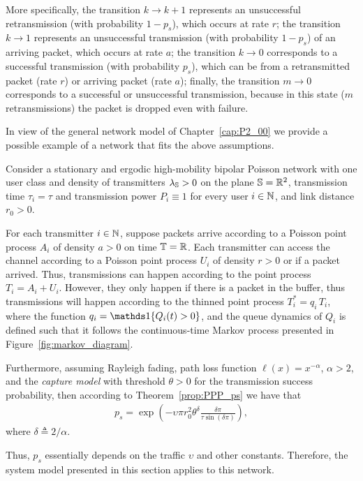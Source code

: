 More specifically,
%
the transition $k\to k+1$ represents an unsuccessful retransmission (with probability $1-p_s$), which occurs at rate $r$;
%
the transition $k\to 1$ represents an unsuccessful transmission (with probability $1-p_s$) of an arriving packet, which occurs at rate $a$;
%
the transition $k\to 0$ corresponds to a successful transmission (with probability $p_s$), which can be from a retransmitted packet (rate $r$) or arriving packet (rate $a$);
%
finally, the transition $m\to 0$ corresponds to a successful or unsuccessful transmission, because in this state ($m$ retransmissions) the packet is dropped even with failure.

In view of the general network model of Chapter~\ref{cap:P2_00} we provide a possible example of a network that fits the above assumptions.
%
\begin{example} 
    Consider a stationary and ergodic high-mobility bipolar Poisson network with one user class and density of transmitters $\lambda_{\S}>0$ on the plane $\S=\R^2$, transmission time $\tau_i = \tau$ and transmission power $P_i \equiv 1$ for every user $i\in\N$, and link distance $r_0 > 0$.
    
    For each transmitter $i\in\N$, suppose packets arrive according to a Poisson point process $A_i$ of density $a>0$ on time $\T = \R$. Each transmitter can access the channel according to a Poisson point process $U_{i}$ of density $r>0$ or if a packet arrived. Thus, transmissions can happen according to the point process $T_i = A_i + U_i$. However, they only happen if there is a packet in the buffer, thus transmissions will happen according to the thinned point process $T^*_{i} = q_i\,T_i$, where the function $q_i = \ind\{Q_i(t) > 0\}$, and the queue dynamics of $Q_i$ is defined such that it follows the continuous-time Markov process presented in Figure~\ref{fig:markov_diagram}.
    
    Furthermore, assuming Rayleigh fading, path loss function $\ell(x) = x^{-\alpha}$, $\alpha>2$, and the \textit{capture model} with threshold $\theta>0$ for the transmission success probability, then according to Theorem~\ref{prop:PPP_ps} we have that
    \begin{align*}
        p_s = \exp\!\left( -\upsilon \pi r_0^2 \theta^\delta \frac{\delta\pi}{\tau\sin(\delta\pi)} \right),
    \end{align*}
    where $\delta\triangleq 2/\alpha$.
    
    Thus, $p_s$ essentially depends on the traffic $\upsilon$ and other constants. Therefore, the system model presented in this section applies to this network.
\end{example}

